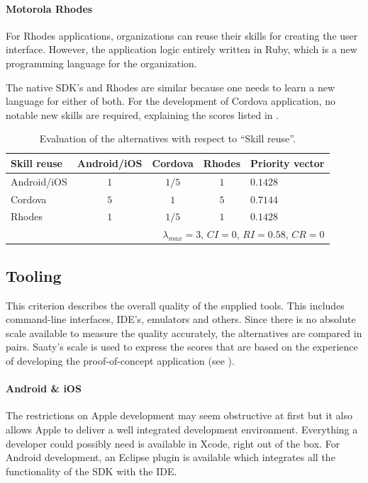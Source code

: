 \paragraph{Motorola Rhodes} For Rhodes applications, organizations can reuse their skills for creating the user interface. However, the application logic entirely written in Ruby, which is a new programming language for the organization.

The native SDK's and Rhodes are similar because one needs to learn a new language for either of both. For the development of Cordova application, no notable new skills are required, explaining the scores listed in .

\begin{table}[h!]
    \centering
    \begin{tabular}{lcccl}
        \hline
        \textbf{Skill reuse} & Android/iOS & Cordova & Rhodes & Priority vector \\
        \hline
        Android/iOS          & $1$         & $1/5$   & $1$    & $0.1428$        \\
        Cordova              & $5$         & $1$     & $5$    & $0.7144$        \\
        Rhodes               & $1$         & $1/5$   & $1$    & $0.1428$        \\
        \hline
        \multicolumn{5}{r}{$\lambda_{max} = 3$, $CI = 0$, $RI = 0.58$, $CR = 0$}\\
        \hline
    \end{tabular}
    \caption{Evaluation of the alternatives with respect to ``Skill reuse''.}
    \label{tab:sr}
\end{table}

\subsection{Tooling}

This criterion describes the overall quality of the supplied tools. This includes command-line interfaces, IDE's, emulators and others. Since there is no absolute scale available to measure the quality accurately, the alternatives are compared in pairs. Saaty's scale is used to express the scores that are based on the experience of developing the proof-of-concept application (see ).

\paragraph{Android \& iOS} The restrictions on Apple development may seem obstructive at first but it also allows Apple to deliver a well integrated development environment. Everything a developer could possibly need is available in Xcode, right out of the box. For Android development, an Eclipse plugin is available which integrates all the functionality of the SDK with the IDE. 

